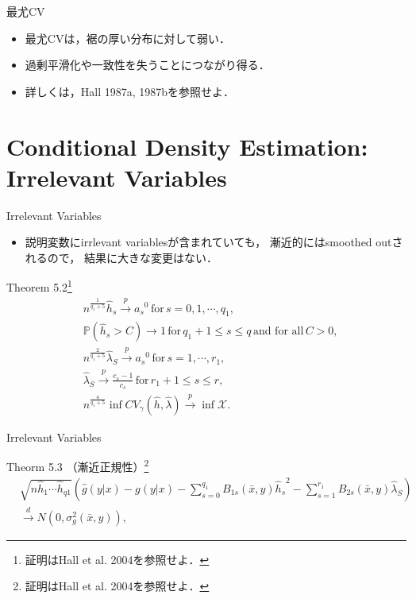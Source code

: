 \documentclass[xcolor=svgnames,dvipdfmx,cjk]{beamer}
\theoremstyle{example}
\begin{document}
\begin{frame}{最尤CV}
  \begin{itemize}
    \item 最尤CVは，裾の厚い分布に対して弱い．
    \item 過剰平滑化や一致性を失うことにつながり得る．
    \item 詳しくは，Hall 1987a, 1987bを参照せよ．
  \end{itemize}
\end{frame}



\section{Conditional Density Estimation: Irrelevant Variables}

\begin{frame}{Irrelevant Variables}
  \begin{itemize}
    \item 説明変数にirrlevant variablesが含まれていても，
          漸近的にはsmoothed outされるので，
          結果に大きな変更はない．
  \end{itemize}
  \begin{itembox}[l]{Theorem 5.2\footnote{証明はHall et al. 2004を参照せよ．}}
    \begin{align*}
      &n^{\frac{1}{q_1 + 5}} \hat{h}_s
       \xrightarrow{p} {a_s}^0 \, \text{for}\,s=0,1,\cdots,q_1, \\
      &\mathbb{P}(\hat{h}_s>C) 
       \rightarrow 1 \, \text{for}\, q_1 + 1 \leq s \leq q \,\text{and for all}\, C > 0,\\
      &n^{\frac{2}{q_1 + 5}} \hat{\lambda}_S
       \xrightarrow{p} {a_s}^0 \, \text{for}\,s=1,\cdots,r_1, \\
      &\hat{\lambda}_S
       \xrightarrow{p} \frac{c_s - 1}{c_s} \,\text{for}\, r_1 + 1 \leq s \leq r,\\
      &n^{\frac{4}{q_1 + 5}} \inf CV_{\gamma}(\hat{h},\hat{\lambda}) 
       \xrightarrow{p} \inf \mathcal{X}.
    \end{align*}
  \end{itembox}
\end{frame}

\begin{frame}{Irrelevant Variables}
  \begin{itembox}[l]{Theorm 5.3 （漸近正規性）\footnote{証明はHall et al. 2004を参照せよ．}}
    \begin{align*}
      &\sqrt{ n \hat{h}_1 \cdots \hat{h}_{q1} }
       \left(
        \hat{g}(y|x) - g(y|x) 
        - \sum_{s=0}^{q_1} B_{1s}(\bar{x},y) {\hat{h}_s}^2
        - \sum_{s=1}^{r_1} B_{2s}(\bar{x},y) \hat{\lambda}_S 
        \right) \\
      & \xrightarrow{d} N(0, \sigma^2_g(\bar{x},y)),
    \end{align*}
  \end{itembox}
\end{frame}
\end{document}
